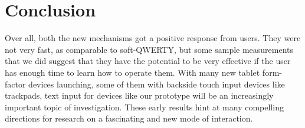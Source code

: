 \section{Conclusion}
Over all, both the new mechanisms got a positive response from users. They were not very fast, as comparable to soft-QWERTY, but some sample measurements that we did suggest that they have the potential to be very effective if the user has enough time to learn how to operate them.  With many new tablet form-factor devices launching, some of them with backside touch input devices like trackpads, text input for devices like our prototype will be an increasingly important topic of investigation.  These early results hint at many compelling directions for research on a fascinating and new mode of interaction.